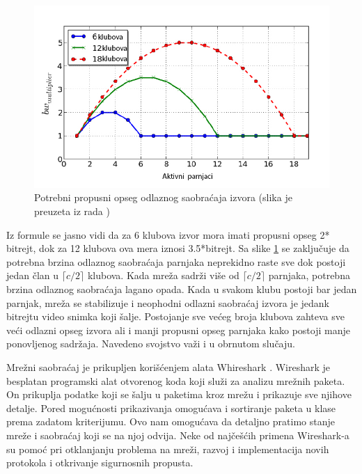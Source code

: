 \documentclass[12pt,oneside]{memoir}
\begin{document}
\begin{figure}[!ht]
  \centering
  \includegraphics[width=1\textwidth]{slike/teorijski-model.jpg}
  \caption{Potrebni  propusni opseg odlaznog saobraćaja izvora (slika je preuzeta iz rada \cite{ClubbingWithThePeers})}
  \label{fig:teorijski-model}
\end{figure}
\par


Iz formule se jasno vidi da za 6 klubova izvor mora imati propusni opseg 2* bitrejt, dok za 12 klubova ova mera iznosi 3.5*bitrejt. Sa slike \ref{fig:teorijski-model} se zaključuje da potrebna brzina odlaznog saobraćaja parnjaka neprekidno raste sve dok postoji jedan član u $ \lceil c/2 \rceil $ klubova. Kada mreža sadrži više od $ \lceil c/2 \rceil $ parnjaka, potrebna brzina odlaznog saobraćaja lagano opada. Kada u svakom klubu postoji bar jedan parnjak, mreža se stabilizuje i neophodni odlazni saobraćaj izvora je jedank bitrejtu video snimka koji šalje. Postojanje sve većeg broja klubova zahteva sve veći odlazni opseg izvora ali i manji propusni opseg parnjaka kako postoji manje ponovljenog sadržaja. Navedeno svojstvo važi i u obrnutom slučaju.

Mrežni saobraćaj je prikupljen korišćenjem alata Whireshark \cite{Whireshark}. Wireshark je besplatan programski alat otvorenog koda koji služi za analizu mrežnih paketa. On prikuplja podatke koji se šalju u paketima kroz mrežu i prikazuje sve njihove detalje. Pored mogućnosti prikazivanja omogućava i sortiranje paketa u klase prema zadatom kriterijumu. Ovo nam omogućava da detaljno pratimo stanje mreže i saobraćaj koji se na njoj odvija. Neke od najčešćih primena Wireshark-a su pomoć pri otklanjanju problema na mreži, razvoj i implementacija novih protokola i otkrivanje sigurnosnih propusta.
\end{document}
